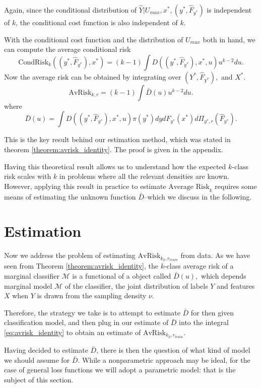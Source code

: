 Again, since the conditional distribution of $\hat{Y}|U_{max}, x^*,
(y^*, \hat{F}_{y^*})$ is independent of $k$, the conditional cost
function is also independent of $k$.

With the conditional cost function and the distribution of $U_{max}$ both in hand, we can compute the average conditional risk
\[
\text{CondRisk}_k((y^*, \hat{F}_{y^*}), x^*) = (k-1) \int D((y^*,\hat{F}_{y^*}), x^*, u) u^{k-2} du.
\]
Now the average risk can be obtained by integrating over $(Y^*, \hat{F}_{Y^*}),$ and $X^*$.
\[
\text{AvRisk}_{k, r} = (k-1) \int \bar{D}(u) u^{k-2} du.
\]
where
\begin{equation}\label{eq:Kbar}
\bar{D}(u) = \int D((y^*,\hat{F}_{y^*}), x^*, u) \pi(y^*)dy dF_{y^*}(x^*) d\Pi_{y^*, r}(\hat{F}_{y^*}).
\end{equation}


This is the key result behind our estimation method, which was stated in theorem \ref{theorem:avrisk_identity}. 
The proof is given in the appendix.

Having this theoretical result allows us to understand how the
expected $k$-class risk scales with $k$ in problems where all the
relevant densities are known.  However, applying this result in
practice to estimate $\text{Average Risk}_k$ requires some means of
estimating the unknown function $\bar{D}$--which we discuss in the
following.

\section{Estimation}\label{sec:extrapolation_estimation}

Now we address the problem of estimating $\text{AvRisk}_{k_2,
r_{train}}$ from data.  As we have seen from
Theorem \ref{theorem:avrisk_identity}, the $k$-class average risk of
a marginal classifier $\mathcal{M}$ is a functional of a object called
$\bar{D}(u),$ which depends marginal model $\mathcal{M}$ of the
classifier, the joint distribution of labels $Y$ and features $X$ when
$Y$ is drawn from the sampling density $\nu$.

Therefore, the strategy we take is to attempt to estimate $\bar{D}$
for then given classification model, and then plug in our estimate of
$\bar{D}$ into the integral \eqref{eq:avrisk_identity} to obtain an
estimate of $\text{AvRisk}_{k_2, r_{train}}$.

Having decided to estimate $\bar{D}$, there is then the question of
what kind of model we should assume for $\bar{D}$.  While a
nonparametric approach may be ideal, for the case of general loss
functions we will adopt a parametric model: that is the subject of
this section.

